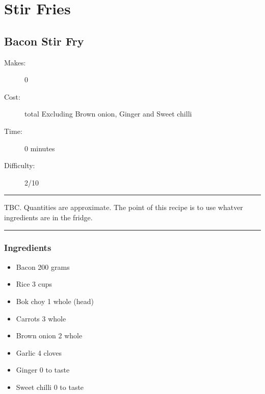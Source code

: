 \documentclass[]{article}
\begin{document}
\section*{\center\Huge\color{accent}Stir Fries}
\label{cat:Stir Fries}
\label{rec:Bacon Stir Fry}
\subsection*{\center\huge Bacon Stir Fry}
\begin{description}
\item[Makes:] 0 
\item[Cost:]  total Excluding Brown onion, Ginger and Sweet chilli
\item[Time:] 0 minutes
\item[Difficulty:] 2/10
\end{description}
\vspace{0.2cm}\hrule\vspace{0.5cm}
\begin{adjustwidth}{0.5 cm}{0.5 cm}

TBC. Quantities are approximate. The point of this recipe is to use whatver ingredients are in the fridge. \hfill\color{accent}{\Large\faGlide\hspace{0.1cm}\faTruck\hspace{0.1cm}}\color{black}

\end{adjustwidth}
\vspace{0.5cm}\hrule
\subsubsection*{\Large Ingredients}
\begin{multicols}{2}
\begin{itemize}
 \item Bacon \hfill 200 grams
 \item Rice \hfill 3 cups
 \item Bok choy \hfill 1 whole (head)
 \item Carrots \hfill 3 whole
 \item Brown onion \hfill 2 whole
 \item Garlic \hfill 4 cloves
 \item Ginger \hfill 0 to taste
 \item Sweet chilli \hfill 0 to taste
\end{itemize}
\end{multicols}
\end{document}
